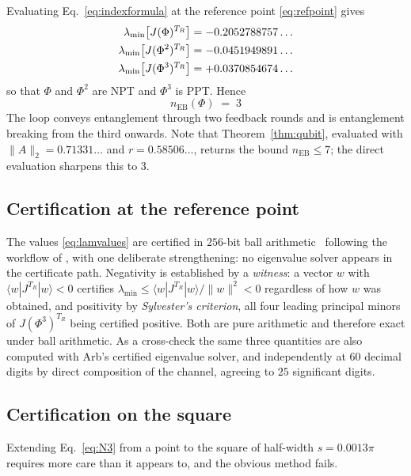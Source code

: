 \documentclass[11pt,a4paper]{article}
\theoremstyle{definition}
\theoremstyle{remark}
\newcommand{\nEB}{n_{\mathrm{EB}}}
\providecommand{\ket}[1]{|#1\rangle}
\providecommand{\bra}[1]{\langle#1|}
\begin{document}
Evaluating Eq.~\eqref{eq:indexformula} at the reference point
\eqref{eq:refpoint} gives
\begin{align}
  \lambda_{\min}\bigl[J(\Phi)^{T_{R}}\bigr]   &= -0.2052788757\ldots \notag\\
  \lambda_{\min}\bigl[J(\Phi^{2})^{T_{R}}\bigr] &= -0.0451949891\ldots \label{eq:lamvalues}\\
  \lambda_{\min}\bigl[J(\Phi^{3})^{T_{R}}\bigr] &= +0.0370854674\ldots \notag
\end{align}
so that $\Phi$ and $\Phi^{2}$ are NPT and $\Phi^{3}$ is PPT. Hence
\begin{equation}\label{eq:N3}
  \boxed{\;\nEB(\Phi)\;=\;3\;}
\end{equation}
The loop conveys entanglement through two feedback rounds and is entanglement
breaking from the third onwards. Note that
Theorem~\ref{thm:qubit}, evaluated with $\|A\|_{2}=0.71331\ldots$ and
$r=0.58506\ldots$, returns the bound $\nEB\le7$; the direct evaluation
sharpens this to $3$.

\subsection{Certification at the reference point}

The values \eqref{eq:lamvalues} are certified in $256$-bit ball
arithmetic~\cite{Arb,pythonflint} following the workflow of
\cite[App.~B]{PaperI}, with one deliberate strengthening: no eigenvalue solver
appears in the certificate path. Negativity is established by a \emph{witness}: a vector
$w$ with $\bra{w}J^{T_{R}}\ket{w}<0$ certifies
$\lambda_{\min}\le\bra{w}J^{T_{R}}\ket{w}/\|w\|^{2}<0$ regardless of how $w$
was obtained, and positivity by \emph{Sylvester's criterion}, all four leading
principal minors of $J(\Phi^{3})^{T_{R}}$ being certified positive. Both are
pure arithmetic and therefore exact under ball arithmetic. As a cross-check the
same three quantities are also computed with Arb's certified eigenvalue solver,
and independently at $60$ decimal digits by direct composition of the channel,
agreeing to $25$ significant digits.

\subsection{Certification on the square}

Extending Eq.~\eqref{eq:N3} from a point to the square of half-width
$s=0.0013\pi$ requires more care than it appears to, and the obvious method
fails.
\end{document}
